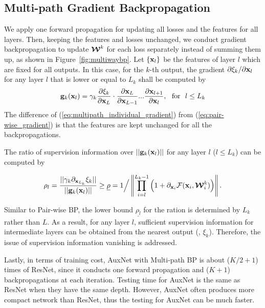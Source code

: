 \documentclass[10pt,onecolumn,letterpaper]{article}
\def\mF{{\mathcal F}}
\def\bmW{\mbox{\boldmath${\mathcal W}$}}
\def\bg{{\bf g}}
\def\bx{{\bf x}}
\begin{document}
\subsection{Multi-path Gradient Backpropagation}
We apply one forward propagation for updating all losses and the features for all layers. Then, keeping the features and losses unchanged, we conduct gradient backpropagation to update $\bmW^{k}$ for each loss separately  instead of summing them up, as shown in Figure~\ref{fig:multiwaybp}.
Let $\{\bx_l\}$ be the features of layer $l$ which are fixed for all outputs. In this case, for the $k$-th output, the gradient ${{\partial \xi_k }}/{{\partial {\bx_l}}}$ for any layer $l$ that is lower or equal to $L_k$ shall be computed by
\begin{eqnarray} \label{eq:multipath_individual_gradient}
\bg_k(\bx_{l}) = \gamma_k \frac{\partial \xi_k }{ \partial \bx_{L} }  \cdot \frac{\partial \bx_{L} }{ \partial \bx_{L-1} }  ...\frac{\partial  \bx_{l+1}  }{\partial \bx_{l} }, ~~\mathrm{for}~~ l\leq L_k
\end{eqnarray}
The difference of (\ref{eq:multipath_individual_gradient}) from (\ref{eq:pair-wise_gradient}) is that the features are kept unchanged for all the backpropagations.

The ratio of supervision information over $||\bg_k(\bx_{l})||$ for any layer $l$ ($l\leq L_k$) can be computed by
\begin{small}{$$\rho_l = \frac{||\gamma_k{\partial_{\bx_{L_k}} \xi_k }||}{||\bg_k(\bx_{l})||} \geq \underline{\rho} =  1 \Big/ \left\|\prod\limits_{i = l}^{L_k - 1} \Big( {1 + \partial_{\bx_i}  {\mF({\bx_i},{{\bmW}_i^k})}} \Big)\right\|.$$}\end{small}
Similar to Pair-wise BP, the lower bound $\underline{\rho_l}$ for the ration is determined by $L_k$ rather than $L$. As a result, for any layer $l$, sufficient supervision information for intermediate layers can be obtained from the nearest output (\ie, $\xi_k$). Therefore, the issue of supervision information vanishing is addressed.

Lastly, in terms of training cost, AuxNet with Multi-path BP is about ($K/2+1$) times of ResNet, since it conducts one forward propagation and ($K+1$) backpropagations at each iteration. Testing time for AuxNet is the same as ResNet when they have the same depth. However, AuxNet often produces
more compact network than ResNet, thus the testing for AuxNet can be much faster.
\end{document}
